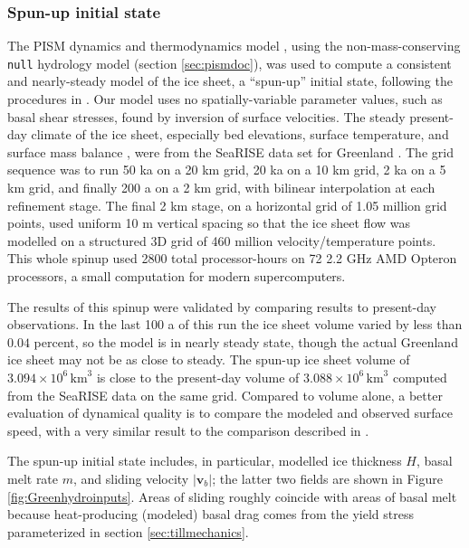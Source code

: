 \documentclass[gmd]{copernicus}   %
\newcommand\bv{\mathbf{v}}
\begin{document}
\subsubsection{Spun-up initial state}  The PISM dynamics and thermodynamics model \citep{BBssasliding,Winkelmannetal2011,AschwandenBuelerKhroulevBlatter}, using the non-mass-conserving \texttt{null} hydrology model (section \ref{sec:pismdoc}), was used to compute a consistent and nearly-steady model of the ice sheet, a ``spun-up'' initial state, following the procedures in \cite{AschwandenAdalgeirsdottirKhroulev}.  Our model uses no spatially-variable parameter values, such as basal shear stresses, found by inversion of surface velocities.  The steady present-day climate of the ice sheet, especially bed elevations, surface temperature, and surface mass balance \citep{Ettemaetal2009}, were from the SeaRISE data set for Greenland \citep{Bindschadler2013SeaRISE}.  The grid sequence was to run 50 ka on a 20 km grid, 20 ka on a 10 km grid, 2 ka on a 5 km grid, and finally 200 a on a 2 km grid, with bilinear interpolation at each refinement stage.  The final 2 km stage, on a horizontal grid of 1.05 million grid points, used uniform 10 m vertical spacing so that the ice sheet flow was modelled on a structured 3D grid of 460 million velocity/temperature points.  This whole spinup used 2800 total processor-hours on 72 2.2 GHz AMD Opteron processors, a small computation for modern supercomputers.

The results of this spinup were validated by comparing results to present-day observations.  In the last 100 a of this run the ice sheet volume varied by less than $0.04$ percent, so the model is in nearly steady state, though the actual Greenland ice sheet may not be as close to steady.  The spun-up ice sheet volume of $3.094\times 10^{6}\,\textrm{km}^3$ is close to the present-day volume of $3.088\times 10^{6}\,\textrm{km}^3$ computed from the SeaRISE data on the same grid.  Compared to volume alone, a better evaluation of dynamical quality is to compare the modeled and observed \citep{Joughinetal2010} surface speed, with a very similar result to the comparison described in \cite{AschwandenAdalgeirsdottirKhroulev}.

The spun-up initial state includes, in particular, modelled ice thickness $H$, basal melt rate $m$, and sliding velocity $|\bv_b|$; the latter two fields are shown in Figure \ref{fig:Greenhydroinputs}.  Areas of sliding roughly coincide with areas of basal melt because heat-producing (modeled) basal drag comes from the yield stress parameterized in section \ref{sec:tillmechanics}.
\end{document}
